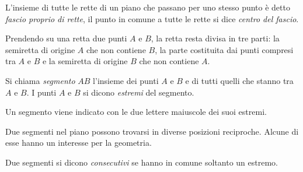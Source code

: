 \begin{definizione}
L'insieme di tutte le rette di un piano che passano per uno stesso 
punto è detto \emph{fascio proprio di rette}, il punto in comune a 
tutte le rette si dice \emph{centro del fascio}. 
\end{definizione}

\begin{inaccessibleblock}
  \begin{center}
   
  \end{center}
\end{inaccessibleblock}

Prendendo su una retta due punti \(A\) e \(B\), la retta resta divisa in 
tre parti: la semiretta di origine \(A\) che non contiene \(B\), la parte 
costituita dai punti compresi tra \(A\) e \(B\) e la semiretta di origine 
\(B\) che non contiene \(A\).

\begin{definizione}
Si chiama \emph{segmento} \(AB\) l'insieme dei punti \(A\) e \(B\) e di 
tutti quelli che stanno tra \(A\) e \(B\).
I punti \(A\) e \(B\) si dicono \emph{estremi} del segmento.
\end{definizione}
Un segmento viene indicato con le due lettere maiuscole dei suoi estremi.

\begin{inaccessibleblock}
 \begin{center} \end{center}
\end{inaccessibleblock}

Due segmenti nel piano possono trovarsi in diverse posizioni 
reciproche. Alcune di esse hanno un interesse per la geometria.

\begin{definizione}
Due segmenti si dicono \emph{consecutivi} se hanno in comune soltanto 
un estremo.%
\end{definizione}

